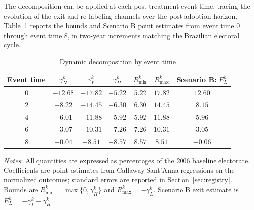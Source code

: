 The decomposition can be applied at each post-treatment event time, tracing the evolution of the exit and re-labeling channels over the post-adoption horizon. Table~\ref{tab:decomposition_dynamic} reports the bounds and Scenario B point estimates from event time 0 through event time 8, in two-year increments matching the Brazilian electoral cycle.

\begin{table}[!ht]
\centering
\caption{Dynamic decomposition by event time}
\label{tab:decomposition_dynamic}
\begin{tabular}{ccccccc}
\toprule
Event time & $\gamma_N^k$ & $\gamma_L^k$ & $\gamma_H^k$ & $R_{\min}^k$ & $R_{\max}^k$ & Scenario B: $E_L^k$ \\
\midrule
0 & $-12.68$ & $-17.82$ & $+5.22$ & $5.22$ & $17.82$ & $12.60$ \\
2 & $-8.22$ & $-14.45$ & $+6.30$ & $6.30$ & $14.45$ & $8.15$ \\
4 & $-6.01$ & $-11.88$ & $+5.92$ & $5.92$ & $11.88$ & $5.96$ \\
6 & $-3.07$ & $-10.31$ & $+7.26$ & $7.26$ & $10.31$ & $3.05$ \\
8 & $+0.04$ & $-8.51$ & $+8.57$ & $8.57$ & $8.51$ & $-0.06$ \\
\bottomrule
\end{tabular}

\medskip
\footnotesize
\textit{Notes}: All quantities are expressed as percentages of the 2006 baseline electorate. Coefficients are point estimates from Callaway-Sant'Anna regressions on the normalized outcomes; standard errors are reported in Section~\ref{sec:registry}. Bounds are $R_{\min}^k = \max\{0, \gamma_H^k\}$ and $R_{\max}^k = -\gamma_L^k$. Scenario B exit estimate is $E_L^k = -\gamma_L^k - \gamma_H^k$.
\end{table}

